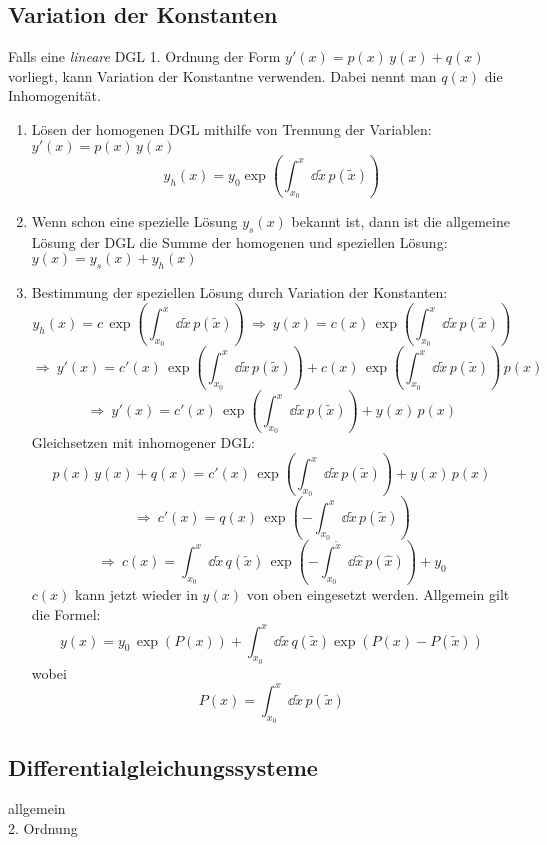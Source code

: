 \subsection{Variation der Konstanten}
\vspace{5pt}
\begin{framedprop}
Falls eine \textit{lineare} DGL 1. Ordnung der Form $y'(x) = p(x) \, y(x) + q(x)$ vorliegt, kann Variation der Konstantne verwenden. Dabei nennt man $q(x)$ die Inhomogenität.

\begin{enumerate}
	\item Lösen der homogenen DGL mithilfe von Trennung der Variablen: $y'(x) = p(x) \, y(x)$
	\[
	y_h(x) = y_0 \exp\left(\int_{x_0}^{x} \dd \tilde{x} \, p(\tilde{x})\right)
	\]
	
	\item Wenn schon eine spezielle Lösung $y_s(x)$ bekannt ist, dann ist die allgemeine Lösung der DGL die Summe der homogenen und speziellen Lösung: $y(x) = y_s(x) + y_h(x)$
	
	\item Bestimmung der speziellen Lösung durch Variation der Konstanten:
	\[
	y_h(x) = c \, \exp\left(\int_{x_0}^{x} \dd \tilde{x} \, p(\tilde{x})\right) \ \Rightarrow\ y(x) = c(x) \, \exp\left(\int_{x_0}^{x} \dd \tilde{x} \, p(\tilde{x})\right)
	\]
	\[
	\Rightarrow\ y'(x) = c'(x) \, \exp\left(\int_{x_0}^{x} \dd \tilde{x} \, p(\tilde{x})\right) + c(x) \, \exp\left(\int_{x_0}^{x} \dd \tilde{x} \, p(\tilde{x})\right) \, p(x)
	\]
	\[
	\Rightarrow\ y'(x) = c'(x) \, \exp\left(\int_{x_0}^{x} \dd \tilde{x} \, p(\tilde{x})\right) + y(x) \, p(x)
	\]
	Gleichsetzen mit inhomogener DGL:
	\[
	p(x) \, y(x) + q(x) = c'(x) \, \exp\left(\int_{x_0}^{x} \dd \tilde{x} \, p(\tilde{x})\right) + y(x) \, p(x)
	\]
	\[
	\Rightarrow\ c'(x) = q(x) \, \exp\left(-\int_{x_0}^{x} \dd \tilde{x} \, p(\tilde{x})\right)
	\]
	\[
	\Rightarrow\ c(x) = \int_{x_0}^{x} \dd \tilde{x} \, q(\tilde{x}) \, \exp\left(- \int_{x_0}^{\tilde{x}} \dd \hat{x} \, p(\hat{x})\right) + y_0
	\]
	$c(x)$ kann jetzt wieder in $y(x)$ von oben eingesetzt werden. Allgemein gilt die Formel:
	\[
	y(x) = y_0 \, \exp(P(x)) + \int_{x_0}^{x} \dd \tilde{x} \, q(\tilde{x}) \exp(P(x) - P(\tilde{x})) 
	\]
	wobei 
	\[
	P(x) = \int_{x_0}^{x} \dd \tilde{x} \, p(\tilde{x})
	\]
\end{enumerate}

\end{framedprop}

\newpage
\subsection{Differentialgleichungssysteme}

allgemein\\2. Ordnung 
